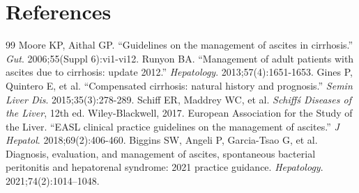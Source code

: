 \section*{References}
\begin{thebibliography}{99}
 Moore KP, Aithal GP. ``Guidelines on the management of ascites in cirrhosis.'' \textit{Gut}. 2006;55(Suppl 6):vi1-vi12.
 Runyon BA. ``Management of adult patients with ascites due to cirrhosis: update 2012.'' \textit{Hepatology}. 2013;57(4):1651-1653.
 Gines P, Quintero E, et al. ``Compensated cirrhosis: natural history and prognosis.'' \textit{Semin Liver Dis}. 2015;35(3):278-289.
 Schiff ER, Maddrey WC, et al. \textit{Schiff\'s Diseases of the Liver}, 12th ed. Wiley-Blackwell, 2017.
 European Association for the Study of the Liver. ``EASL clinical practice guidelines on the management of ascites.'' \textit{J Hepatol}. 2018;69(2):406-460.
 Biggins SW, Angeli P, Garcia-Tsao G, et al. Diagnosis, evaluation, and management of ascites, spontaneous bacterial peritonitis and hepatorenal syndrome: 2021 practice guidance. \textit{Hepatology}. 2021;74(2):1014--1048.
\end{thebibliography}
